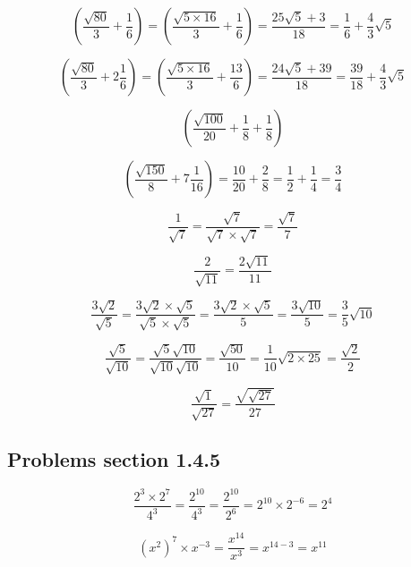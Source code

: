 \begin{equation}
 \left ( \frac{\sqrt{80}}{3} + \frac{1}{6} \right) =  \left ( \frac{\sqrt{5 \times 16}}{3} + \frac{1}{6} \right) = \frac{25 \sqrt{5} + 3}{18} = \frac{1}{6} + \frac{4}{3}\sqrt{5}
\end{equation}

\begin{equation}
 \left (  \frac{\sqrt{80}}{3} + 2\frac{1}{6} \right ) =  \left (  \frac{\sqrt{5 \times 16}}{3} + \frac{13}{6} \right ) = \frac{24 \sqrt{5} + 39}{18} = \frac{39}{18} + \frac{4}{3} \sqrt{5}
\end{equation}

\begin{equation}
 \left (  \frac{\sqrt{100}}{20} + \frac{1}{8} + \frac{1}{8} \right )
\end{equation}

\begin{equation}
 \left (  \frac{\sqrt{150}}{8} + 7\frac{1}{16}\right ) = \frac{10}{20} + \frac{2}{8} = \frac{1}{2} + \frac{1}{4} = \frac{3}{4}
\end{equation}

\begin{equation}
  \frac{1}{\sqrt{7}} =  \frac{\sqrt{7}}{\sqrt{7} \times \sqrt{7}} = \frac{\sqrt{7}}{7}
\end{equation}

\begin{equation}
  \frac{2}{\sqrt{11}} = \frac{2 \sqrt{11}}{11}
\end{equation}

\begin{equation}
  \frac{3 \sqrt{2}}{\sqrt{5}} = \frac{3 \sqrt{2} \times \sqrt{5}}{\sqrt{5} \times \sqrt{5}} = \frac{3 \sqrt{2} \times \sqrt{5}}{5} = \frac{3 \sqrt{10}}{5} = \frac{3}{5}\sqrt{10}
\end{equation}

\begin{equation}
  \frac{\sqrt{5}}{\sqrt{10}} = \frac{\sqrt{5} \sqrt{10}}{\sqrt{10}\sqrt{10}} = \frac{\sqrt{50}}{10} = \frac{1}{10} \sqrt{2 \times 25} = \frac{\sqrt{2}}{2}
\end{equation}

\begin{equation}
  \frac{\sqrt{1}}{\sqrt{27}} = \frac{\sqrt{\sqrt{27}}}{27}
\end{equation}

\subsection{Problems section 1.4.5}

\begin{equation}
  \frac{2^{3} \times 2^{7}}{4^{3}} = \frac{2^{10}}{4^{3}} = \frac{2^{10}}{2^{6}} = 2^{10} \times 2^{-6} = 2^{4}
\end{equation}

\begin{equation}
  (x^{2})^{7} \times x^{-3} = \frac{x^{14}}{x^{3}} = x^{14-3} = x^{11}
\end{equation}
